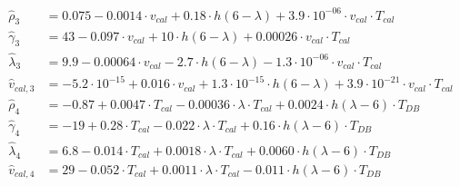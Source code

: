 \begin{align}
%
%
%
    \label{eq:emma-phd3}
    \hat{\rho}_3 &= 0.075  -   0.0014 \cdot  v_{cal}  +    0.18 \cdot  h(6-\lambda)  + 3.9\cdot 10^{-06} \cdot  v_{cal}\cdot T_{cal} \\
    \label{eq:emma-G3}
    \hat{\gamma}_3 &= 43  -   0.097 \cdot  v_{cal}  +     10 \cdot  h(6-\lambda)  + 0.00026 \cdot  v_{cal}\cdot T_{cal} \\
    \label{eq:emma-layr3}
    \hat{\lambda}_3 &= 9.9  - 0.00064 \cdot  v_{cal}  -     2.7 \cdot  h(6-\lambda)  - 1.3\cdot 10^{-06} \cdot  v_{cal}\cdot T_{cal} \\
    \label{eq:emma-vcal3}
    \hat{v}_{cal,3} &= -5.2\cdot 10^{-15}  +   0.016 \cdot  v_{cal}  + 1.3\cdot 10^{-15} \cdot  h(6-\lambda)  + 3.9\cdot 10^{-21} \cdot  v_{cal}\cdot T_{cal} \\
%
    \label{eq:emma-phd4}
    \hat{\rho}_4 &=  -0.87 + 0.0047 \cdot  T_{cal} - 0.00036 \cdot  \lambda\cdot T_{cal}  +  0.0024 \cdot  h(\lambda-6)\cdot T_{DB} \\
    \label{eq:emma-G4}
    \hat{\gamma}_4 &=     -19 + 0.28 \cdot  T_{cal}  - 0.022 \cdot  \lambda\cdot T_{cal}  +  0.16 \cdot  h(\lambda-6)\cdot T_{DB} \\
    \label{eq:emma-layr4}
    \hat{\lambda}_4 &=  6.8 - 0.014 \cdot  T_{cal}  + 0.0018 \cdot  \lambda\cdot T_{cal}  + 0.0060 \cdot  h(\lambda-6)\cdot T_{DB} \\
    \label{eq:emma-vcal4}
    \hat{v}_{cal,4} &=  29 - 0.052 \cdot  T_{cal}  + 0.0011 \cdot  \lambda\cdot T_{cal}  -  0.011 \cdot  h(\lambda-6)\cdot T_{DB} 
\end{align}

